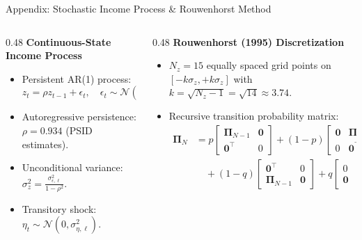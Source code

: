 \documentclass[aspectratio=169, 10pt]{beamer}
\begin{document}
\begin{frame}{Appendix: Stochastic Income Process \& Rouwenhorst Method \hfill \hyperlink{main:preferences}{\scriptsize{}}}\label{backup:rouwenhorst}
    \begin{columns}[T]
        \begin{column}{0.48\textwidth}
            \textbf{\small Continuous-State Income Process}
            \vspace{0.05cm}
            \begin{itemize}\scriptsize\setlength{\itemsep}{2pt}
                \item Persistent AR(1) process:
                $$z_t = \rho z_{t-1} + \epsilon_t, \quad \epsilon_t \sim \mathcal{N}(0, \sigma_{\epsilon,\ell}^2)$$
                \item Autoregressive persistence: $\rho = 0.934$ (PSID estimates).
                \item Unconditional variance: $\sigma_z^2 = \frac{\sigma_{\epsilon,\ell}^2}{1 - \rho^2}$.
                \item Transitory shock: $\eta_t \sim \mathcal{N}(0, \sigma_{\eta,\ell}^2)$.
            \end{itemize}
        \end{column}
        \begin{column}{0.48\textwidth}
            \textbf{\small Rouwenhorst (1995) Discretization}
            \vspace{0.05cm}
            \begin{itemize}\scriptsize\setlength{\itemsep}{2pt}
                \item $N_z = 15$ equally spaced grid points on $[-k\sigma_z, +k\sigma_z]$ with $k = \sqrt{N_z - 1} = \sqrt{14} \approx 3.74$.
                \item Recursive transition probability matrix:
                {\tiny
                \setlength{\arraycolsep}{1.5pt}
                \begin{align*}
                \boldsymbol{\Pi}_N &= p \begin{bmatrix} \boldsymbol{\Pi}_{N-1} & \mathbf{0} \\ \mathbf{0}^\top & 0 \end{bmatrix} + (1-p) \begin{bmatrix} \mathbf{0} & \boldsymbol{\Pi}_{N-1} \\ 0 & \mathbf{0}^\top \end{bmatrix} \\
                &\quad + (1-q) \begin{bmatrix} \mathbf{0}^\top & 0 \\ \boldsymbol{\Pi}_{N-1} & \mathbf{0} \end{bmatrix} + q \begin{bmatrix} 0 & \mathbf{0}^\top \\ \mathbf{0} & \boldsymbol{\Pi}_{N-1} \end{bmatrix}

\end{align*}}
\end{itemize}
\end{column}
\end{columns}
\end{frame}
\end{document}
